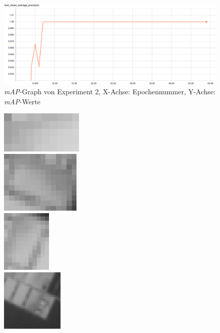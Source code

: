 \begin{figure}[ht]
	\centering
    \includegraphics[width=.7\textwidth]{pics/map-2.PNG}
    \caption[\textit{mAP}-Graph von Experiment 2]{\textit{mAP}-Graph von Experiment 2, X-Achse: Epochennummer, Y-Achse: \textit{mAP}-Werte}
    \label{fig:map-2}
\end{figure}

\begin{figure}[ht]
  \centering
  \begin{minipage}[c]{.3\textwidth}
  \centering
  \includegraphics[height=2cm]{pics/roi-2-1.png}
  \\ \vspace{.25cm}
  \includegraphics[height=3cm]{pics/roi-2-2.png}
  \\ \vspace{.25cm}
  \includegraphics[height=3cm]{pics/roi-2-3.png}
  \\ \vspace{.25cm}
  \includegraphics[height=3cm]{pics/roi-2-4.png}

\end{minipage}
\end{figure}
